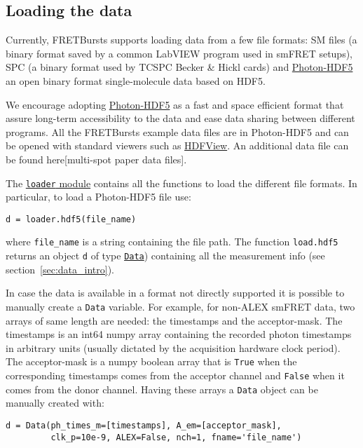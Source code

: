 \subsection{Loading the data}
Currently, FRETBursts supports loading data from a few file formats: SM files (a binary format saved by a common LabVIEW program used in smFRET setups), SPC (a binary format used by TCSPC Becker \& Hickl cards) and \href{http://photon-hdf5.readthedocs.org/}{Photon-HDF5}  an open binary format single-molecule data based on HDF5.

We encourage adopting \href{http://photon-hdf5.readthedocs.org/}{Photon-HDF5} as a fast and space efficient format that assure long-term accessibility to the data and ease data sharing between different programs. All the FRETBursts example data files are in Photon-HDF5 and can be opened with standard viewers such as \href{http://www.hdfgroup.org/products/java/hdfview/}{HDFView}. An additional data file can be found here[multi-spot paper data files].

The \href{http://fretbursts.readthedocs.org/en/latest/loader.html}{\texttt{loader} module}
contains all the functions to load the different file formats. In particular, to load a Photon-HDF5 file use:

\begin{verbatim}
d = loader.hdf5(file_name)
\end{verbatim}

where \verb|file_name| is a string containing the file path. The function \verb|load.hdf5| returns an object \verb|d| of type \href{http://fretbursts.readthedocs.org/en/latest/data_class.html}{\texttt{Data}}) containing all the measurement info (see section~\ref{sec:data_intro}).

In case the data is available in a format not directly supported it is possible to manually create a \verb|Data| variable. For example, for non-ALEX smFRET data, two arrays of same length are needed: the timestamps and the acceptor-mask. The timestamps is an int64 numpy array containing the recorded photon timestamps in arbitrary units (usually dictated by the acquisition hardware clock period). The acceptor-mask is a numpy boolean array that is \verb|True| when the corresponding timestamps comes from the acceptor channel and \verb|False| when it comes from the donor channel. Having these arrays a \verb|Data| object can be manually created with:

\begin{verbatim}
d = Data(ph_times_m=[timestamps], A_em=[acceptor_mask], 
         clk_p=10e-9, ALEX=False, nch=1, fname='file_name')
\end{verbatim}

